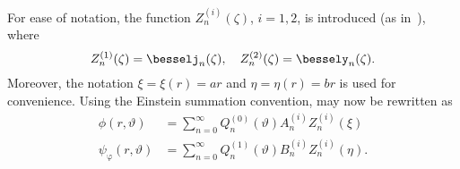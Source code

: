 For ease of notation, the function $Z_n^{(i)}(\zeta)$, $i=1,2$, is introduced (as in~\cite{Chang1994voa, Chang1994soa}), where 
\begin{equation}
	Z_n^{(1)}(\zeta) = \besselj_n(\zeta),\quad Z_n^{(2)}(\zeta) = \bessely_n(\zeta).
\end{equation}
Moreover, the notation $\xi = \xi(r) = ar$ and $\eta = \eta(r) = br$ is used for convenience. Using the Einstein summation convention,  may now be rewritten as
\begin{align}
	\phi(r,\vartheta) &= \sum_{n=0}^\infty Q_n^{(0)}(\vartheta)A_n^{(i)}Z_n^{(i)}(\xi)\label{Eq1:phiSolutionSimplified}\\
	\psi_\upvarphi(r,\vartheta) &= \sum_{n=0}^\infty Q_n^{(1)}(\vartheta)B_n^{(i)}Z_n^{(i)}(\eta).\label{Eq1:psiSolutionSimplified}
\end{align}

